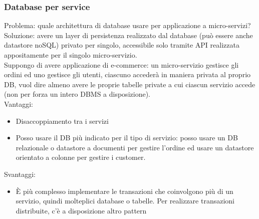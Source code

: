 \documentclass{article}
\begin{document}
\subsubsection{Database per service}
Problema: quale architettura di database usare per applicazione a micro-servizi?\\ Soluzione: avere un layer di persistenza realizzato dal database (può essere anche datastore noSQL) privato per singolo, accessibile solo tramite API realizzata appositamente per il singolo micro-servizio.\\ Suppongo di avere applicazione di e-commerce: un micro-servizio gestisce gli ordini ed uno gestisce gli utenti, ciascuno accederà in maniera privata al proprio DB, vuol dire almeno avere le proprie tabelle private a cui ciascun servizio accede (non per forza un intero DBMS a disposizione).\\ Vantaggi:
\begin{itemize}
\item Disaccoppiamento tra i servizi
\item Posso usare il DB più indicato per il tipo di servizio: posso usare un DB relazionale o datastore a documenti per gestire l'ordine ed usare un datastore orientato a colonne per gestire i customer.
\end{itemize}
Svantaggi:
\begin{itemize}
\item È più complesso implementare le transazioni che coinvolgono più di un servizio, quindi molteplici database o tabelle. Per realizzare transazioni distribuite, c'è a disposizione altro pattern
\end{itemize}
\end{document}
